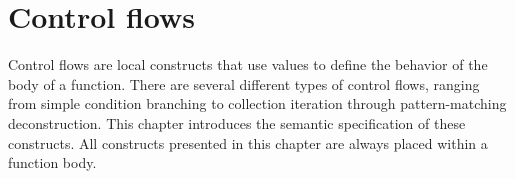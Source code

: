 \chapter{Control flows}%
\pagecolor{gray!10!white}

\label{chap:control_flows}

Control flows are local constructs that use values to define the behavior of the
body of a function. There are several different types of control flows, ranging
from simple condition branching to collection iteration through pattern-matching
deconstruction. This chapter introduces the semantic specification of these
constructs. All constructs presented in this chapter are always placed within a
function body.

\minitoc%

